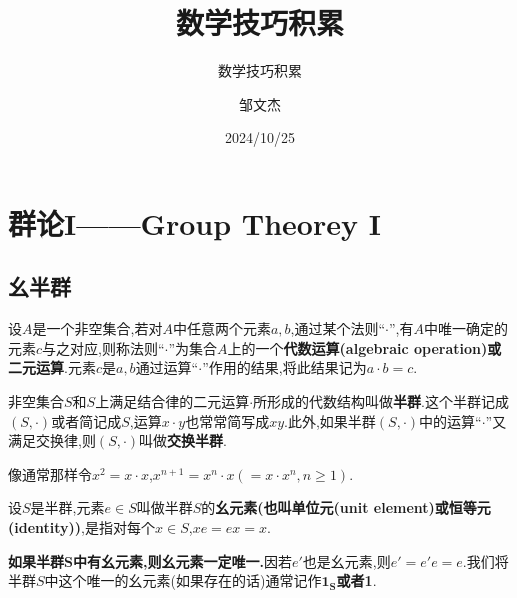 \documentclass[lang=cn,newtx,10pt,scheme=chinese]{elegantbook}
\title{数学技巧积累}
\subtitle{数学技巧积累}
\author{邹文杰}
\institute{无}
\date{2024/10/25}
\begin{document}
\maketitle
\frontmatter

\tableofcontents

\mainmatter
\everymath{\displaystyle} %

\chapter{群论I——Group Theorey I}

\section{幺半群}

\begin{definition}\label{definition:代数运算/二元运算定义}
设\(A\)是一个非空集合,若对\(A\)中任意两个元素\(a,b\),通过某个法则“\(\cdot\)”,有\(A\)中唯一确定的元素\(c\)与之对应,则称法则“\(\cdot\)”为集合\(A\)上的一个\textbf{代数运算(algebraic operation)或二元运算}.元素\(c\)是\(a,b\)通过运算“\(\cdot\)”作用的结果,将此结果记为\(a \cdot b = c\).
\end{definition}

\begin{definition}[(交换)半群定义]\label{definition:(交换)半群定义}
非空集合\(S\)和\(S\)上满足结合律的二元运算\(\cdot\)所形成的代数结构叫做\textbf{半群}.这个半群记成\((S,\cdot)\)或者简记成\(S\),运算\(x\cdot y\)也常常简写成\(xy\).此外,如果半群\((S,\cdot)\)中的运算“$\cdot$”又满足交换律,则\((S,\cdot)\)叫做\textbf{交换半群}.
\end{definition}
\begin{remark}
    像通常那样令\(x^2 = x\cdot x\),\(x^{n + 1} = x^n\cdot x( = x\cdot x^n, n\geq1)\).
\end{remark}

\begin{definition}[幺元素定义]\label{definition:幺元素定义}
    设\(S\)是半群,元素\(e\in S\)叫做半群\(S\)的\textbf{幺元素(也叫单位元(unit element)或恒等元(identity))},是指对每个\(x\in S\),\(xe = ex = x\).
\end{definition}
\begin{note}
    \textbf{如果半群$\boldsymbol{S}$中有幺元素,则幺元素一定唯一.}因若$e'$也是幺元素,则$e'=e'e=e$.我们将半群$S$中这个唯一的幺元素(如果存在的话)通常记作$\boldsymbol{1_S}$\textbf{或者1}.
\end{note}
\end{document}
